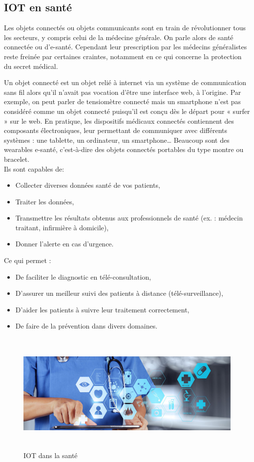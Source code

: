 \documentclass[12pt]{article}
\begin{document}
\subsection{IOT en santé}
Les objets connectés ou objets communicants sont en train de révolutionner tous les secteurs, y compris celui de la médecine générale. On parle alors de santé connectée ou d’e-santé. Cependant leur prescription par les médecins généralistes reste freinée par certaines craintes, notamment en ce qui concerne la protection du secret médical.

Un objet connecté est un objet relié à internet via un système de communication sans fil alors qu’il n’avait pas vocation d’être une interface web, à l’origine. Par exemple, on peut parler de tensiomètre connecté mais un smartphone n’est pas considéré comme un objet connecté puisqu’il est conçu dès le départ pour « surfer » sur le web. En pratique, les dispositifs médicaux connectés contiennent des composants électroniques, leur permettant de communiquer avec différents systèmes : une tablette, un ordinateur, un smartphone… Beaucoup sont des wearables e-santé, c’est-à-dire des objets connectés portables du type montre ou bracelet.\\
Ils sont capables de:
\begin{itemize}
	\item Collecter diverses données santé de vos patients,
	\item Traiter les données,
	\item Transmettre les résultats obtenus aux professionnels de santé (ex. : médecin traitant, infirmière à domicile),
	\item Donner l’alerte en cas d’urgence.
\end{itemize}
Ce qui permet :
\begin{itemize}
	\item De faciliter le diagnostic en télé-consultation,
	\item D’assurer un meilleur suivi des patients à distance (télé-surveillance),
	\item D’aider les patients à suivre leur traitement correctement,
	\item De faire de la prévention dans divers domaines.
\end{itemize}
\begin{figure}[h]
	\centering
	\includegraphics[height=6cm, width=15cm]{img-Chapiter-2/IOT.jpg}
	\caption{ IOT dans la santé}
\end{figure}
\newpage
\end{document}
